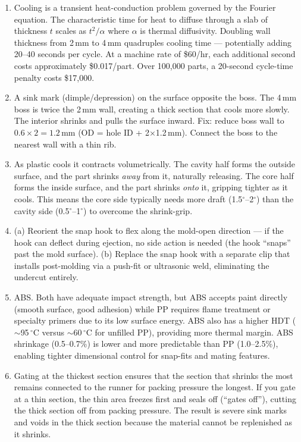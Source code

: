 \documentclass[11pt,letterpaper,twoside,openany]{book}
\providecommand{\ang}[1]{#1\ensuremath{{}^{\circ}}}
\begin{document}
\begin{enumerate}[leftmargin=1.5em]
  \item Cooling is a transient heat-conduction problem governed by the Fourier equation. The characteristic time for heat to diffuse through a slab of thickness $t$ scales as $t^2 / \alpha$ where $\alpha$ is thermal diffusivity. Doubling wall thickness from 2\,mm to 4\,mm quadruples cooling time --- potentially adding 20--40 seconds per cycle. At a machine rate of \$60/hr, each additional second costs approximately \$0.017/part. Over 100,000 parts, a 20-second cycle-time penalty costs \$17,000.

  \item A sink mark (dimple/depression) on the surface opposite the boss. The 4\,mm boss is twice the 2\,mm wall, creating a thick section that cools more slowly. The interior shrinks and pulls the surface inward. Fix: reduce boss wall to $0.6 \times 2 = 1.2$\,mm (OD = hole ID + 2$\times$1.2\,mm). Connect the boss to the nearest wall with a thin rib.

  \item As plastic cools it contracts volumetrically. The cavity half forms the outside surface, and the part shrinks \emph{away} from it, naturally releasing. The core half forms the inside surface, and the part shrinks \emph{onto} it, gripping tighter as it cools. This means the core side typically needs more draft (\ang{1.5}--\ang{2}) than the cavity side (\ang{0.5}--\ang{1}) to overcome the shrink-grip.

  \item (a) Reorient the snap hook to flex along the mold-open direction --- if the hook can deflect during ejection, no side action is needed (the hook ``snaps'' past the mold surface). (b) Replace the snap hook with a separate clip that installs post-molding via a push-fit or ultrasonic weld, eliminating the undercut entirely.

  \item ABS. Both have adequate impact strength, but ABS accepts paint directly (smooth surface, good adhesion) while PP requires flame treatment or specialty primers due to its low surface energy. ABS also has a higher HDT ($\sim$95\,$^{\circ}$C versus $\sim$60\,$^{\circ}$C for unfilled PP), providing more thermal margin. ABS shrinkage (0.5--0.7\%) is lower and more predictable than PP (1.0--2.5\%), enabling tighter dimensional control for snap-fits and mating features.

  \item Gating at the thickest section ensures that the section that shrinks the most remains connected to the runner for packing pressure the longest. If you gate at a thin section, the thin area freezes first and seals off (``gates off''), cutting the thick section off from packing pressure. The result is severe sink marks and voids in the thick section because the material cannot be replenished as it shrinks.


\end{enumerate}
\end{document}
